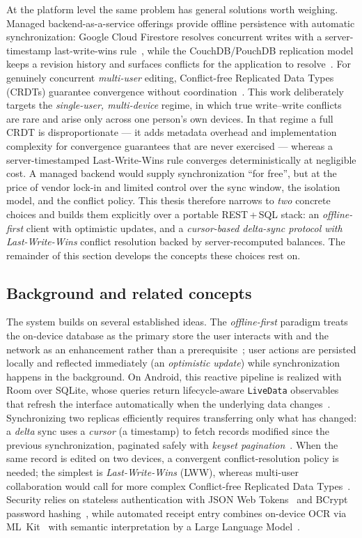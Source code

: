 \documentclass[13pt,a4paper]{extarticle}
\begin{document}
At the platform level the same problem has general solutions worth weighing. Managed
backend-as-a-service offerings provide offline persistence with automatic synchronization: Google
Cloud Firestore resolves concurrent writes with a server-timestamp last-write-wins
rule~\cite{firestore}, while the CouchDB/PouchDB replication model keeps a revision history and
surfaces conflicts for the application to resolve~\cite{couchdb}. For genuinely concurrent
\emph{multi-user} editing, Conflict-free Replicated Data Types (CRDTs) guarantee convergence without
coordination~\cite{crdt}. This work deliberately targets the \emph{single-user, multi-device} regime,
in which true write--write conflicts are rare and arise only across one person's own devices. In that
regime a full CRDT is disproportionate --- it adds metadata overhead and implementation complexity for
convergence guarantees that are never exercised --- whereas a server-timestamped Last-Write-Wins rule
converges deterministically at negligible cost. A managed backend would supply synchronization
``for free'', but at the price of vendor lock-in and limited control over the sync window, the
isolation model, and the conflict policy. This thesis therefore narrows to \emph{two} concrete
choices and builds them explicitly over a portable REST\,+\,SQL stack: an \emph{offline-first} client
with optimistic updates, and a \emph{cursor-based delta-sync protocol with Last-Write-Wins} conflict
resolution backed by server-recomputed balances. The remainder of this section develops the concepts
these choices rest on.

\subsection{Background and related concepts}
The system builds on several established ideas. The \textit{offline-first} paradigm treats the
on-device database as the primary store the user interacts with and the network as an enhancement
rather than a prerequisite~\cite{android-offline}; user actions are persisted locally and reflected
immediately (an \textit{optimistic update}) while synchronization happens in the background. On
Android, this reactive pipeline is realized with Room over SQLite, whose queries return
lifecycle-aware \texttt{LiveData} observables that refresh the interface automatically when the
underlying data changes~\cite{room}. Synchronizing two replicas efficiently requires transferring
only what has changed: a \textit{delta} sync uses a \textit{cursor} (a timestamp) to fetch records
modified since the previous synchronization, paginated safely with \textit{keyset
pagination}~\cite{keyset}. When the same record is edited on two devices, a convergent
conflict-resolution policy is needed; the simplest is \textit{Last-Write-Wins} (LWW), whereas
multi-user collaboration would call for more complex Conflict-free Replicated Data
Types~\cite{crdt}. Security relies on stateless authentication with JSON Web
Tokens~\cite{jwt} and BCrypt password hashing~\cite{bcrypt}, while automated receipt entry combines
on-device OCR via ML~Kit~\cite{mlkit} with semantic interpretation by a Large Language
Model~\cite{gemini}.
\end{document}
